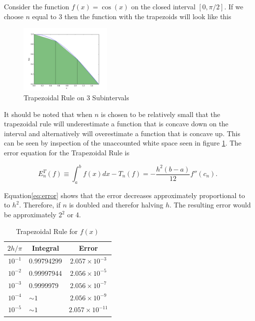\documentclass[10pt, reqno]{article}
\numberwithin{equation}{section}
\numberwithin{figure}{section}
\begin{document}
\begin{exmp}
Consider the function $f(x) = \cos(x)$ on the closed interval $[0,\pi/2]$. If we choose $n$ equal to 3 then the function with the trapezoids will look like this 

\begin{figure}[H] %
\centering
\includegraphics[width=0.4\textwidth]{HW6-plot.png}
\caption{Trapezoidal Rule on 3 Subintervals}
\label{fig:cosine_example}
\end{figure}

It should be noted that when $n$ is chosen to be relatively small that the trapezoidal rule will underestimate a function that is concave down on the interval and alternatively will overestimate a function that is concave up. This can be seen by inspection of the unaccounted white space seen in figure \ref{fig:cosine_example}. 
The error equation for the Trapezoidal Rule is\cite{ref:Atkinson}  

\begin{equation}
\label{eq:error}
E_{n}^{T}(f) \equiv \int_{a}^{b} f(x) dx - T_n(f) = - \frac{h^2 (b-a)}{12} f''(c_n).
\end{equation}

\noindent Equation\ref{eq:error} shows that the error decreases approximately proportional to to $h^2$. Therefore, if $n$ is doubled and therefor halving $h$. The resulting error would be approximately $2^2$ or 4.\cite{ref:Atkinson}  

\begin{table}[H]
\begin{center}
\caption{Trapezoidal Rule for $f(x)$}
\begin{tabular}{|c|l c|}
\hline
\boldmath$2h/\pi$ & \multicolumn{1}{|c}{\textbf{Integral}} & \multicolumn{1}{c|}{\textbf{Error}} \\ \hline 
$10^{-1}$ & 0.99794299 & $2.057 \times 10^{-3}$ \\ 
$10^{-2}$ & 0.99997944 & $2.056 \times 10^{-5}$ \\ 
$10^{-3}$ & 0.9999979 & $2.056 \times 10^{-7}$ \\ 
$10^{-4}$ & $\sim 1$ & $2.056 \times 10^{-9} $\\
$10^{-5}$ & $\sim 1$ & $2.057 \times 10^{-11}$ \\  
\hline
\end{tabular}
\end{center}
\end{table}



\end{exmp}
\end{document}
